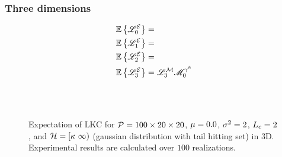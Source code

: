 \documentclass[12pt]{article}
\begin{document}
\newpage
\subsubsection{Three dimensions}
\begin{subequations}
\begin{align}
  &\Expec\left\{\LKC_0^\ES\right\} = \\%
  &\Expec\left\{\LKC_1^\ES\right\} = \\%
  &\Expec\left\{\LKC_2^\ES\right\} = \\%
  &\Expec\left\{\LKC_3^\ES\right\} = \LKC_3^\MRF\GMFk_0
\end{align}
\end{subequations}

\begin{figure}[!h]
  \centering
  \subfigure{\scalebox{0.5}{}}\hspace{1.2cm}
  \subfigure{\scalebox{0.5}{}}\\
  \subfigure{\scalebox{0.5}{}}\hspace{1.2cm}
  \subfigure{\scalebox{0.5}{}}\\
  \caption{Expectation of LKC for $\mathcal{P}=100\times 20 \times 20$, $\mu=0.0$, $\sigma^2=2$, $L_c=2$, and $\mathcal{H}=[\kappa\ \infty)$ (gaussian distribution with tail hitting set) in 3D. Experimental results are calculated over $100$ realizations.}
\end{figure}

\newpage
\end{document}
